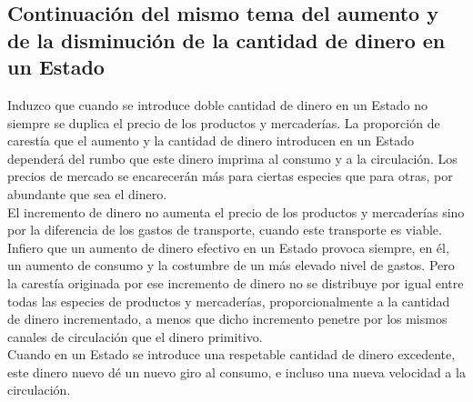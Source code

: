 \documentclass[10pt]{article}
\begin{document}
\begin{multicols}{1}
\section*{Continuación del mismo tema del aumento y de la disminución de la cantidad de dinero en un Estado}
Induzco que cuando se introduce doble cantidad de dinero en un Estado no siempre se duplica el precio de los productos y mercaderías. La proporción de carestía que el aumento y la cantidad de dinero introducen en un Estado dependerá del rumbo que este dinero imprima al consumo y a la circulación. Los precios de mercado se encarecerán más para ciertas especies que para otras, por abundante que sea el dinero.\\
El incremento de dinero no aumenta el precio de los productos y mercaderías sino por la diferencia de los gastos de transporte, cuando este transporte es viable.\\
Infiero que un aumento de dinero efectivo en un Estado provoca siempre, en él, un aumento de consumo y la costumbre de un más elevado nivel de gastos. Pero la carestía originada por ese incremento de dinero no se distribuye por igual entre todas las especies de productos y mercaderías, proporcionalmente a la cantidad de dinero incrementado, a menos que dicho incremento penetre por los mismos canales de circulación que el dinero primitivo. \\
Cuando en un Estado se introduce una respetable cantidad de dinero excedente, este dinero nuevo dé un nuevo giro al consumo, e incluso una nueva velocidad a la circulación.

\end{multicols}
\end{document}
